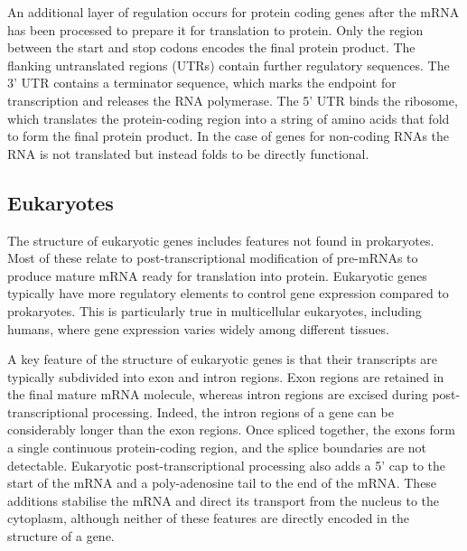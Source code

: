 An additional layer of regulation occurs for protein coding genes after the mRNA has been processed to prepare it for 
translation to protein. Only the region between the start and stop codons encodes the final protein product. The flanking 
untranslated regions (UTRs) contain further regulatory sequences. The 3' UTR contains a terminator sequence, which marks 
the endpoint for transcription and releases the RNA polymerase. The 5' UTR binds the ribosome, which translates the 
protein-coding region into a string of amino acids that fold to form the final protein product. In the case of genes for 
non-coding RNAs the RNA is not translated but instead folds to be directly functional.

\subsection{Eukaryotes}
The structure of eukaryotic genes includes features not found in prokaryotes. Most of these relate to post-transcriptional 
modification of pre-mRNAs to produce mature mRNA ready for translation into protein. Eukaryotic genes typically have more 
regulatory elements to control gene expression compared to prokaryotes. This is particularly true in multicellular eukaryotes, 
including humans, where gene expression varies widely among different tissues.  

A key feature of the structure of eukaryotic genes is that their transcripts are typically subdivided into exon and intron 
regions. Exon regions are retained in the final mature mRNA molecule, whereas intron regions are excised during post-transcriptional 
processing. Indeed, the intron regions of a gene can be considerably longer than the exon regions. Once spliced together, 
the exons form a single continuous protein-coding region, and the splice boundaries are not detectable. Eukaryotic 
post-transcriptional processing also adds a 5' cap to the start of the mRNA and a poly-adenosine tail to the end of the mRNA. 
These additions stabilise the mRNA and direct its transport from the nucleus to the cytoplasm, although neither of these 
features are directly encoded in the structure of a gene.

